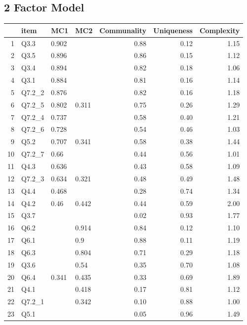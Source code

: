 \documentclass[../main.tex]{subfiles}
\begin{document}
        \subsection{2 Factor Model}

            \begin{table}[ht]
                \centering
                \begin{tabular}{rlllrrr}
                    \hline
                    & item & MC1 & MC2 & Communality & Uniqueness & Complexity \\
                    \hline
                    1 & Q3.3 & 0.902 &  & 0.88 & 0.12 & 1.15 \\
                    2 & Q3.5 & 0.896 &  & 0.86 & 0.15 & 1.12 \\
                    3 & Q3.4 & 0.894 &  & 0.82 & 0.18 & 1.06 \\
                    4 & Q3.1 & 0.884 &  & 0.81 & 0.16 & 1.14 \\
                    5 & Q7.2\_2 & 0.876 &  & 0.82 & 0.16 & 1.18 \\
                    6 & Q7.2\_5 & 0.802 & 0.311 & 0.75 & 0.26 & 1.29 \\
                    7 & Q7.2\_4 & 0.737 &  & 0.58 & 0.40 & 1.21 \\
                    8 & Q7.2\_6 & 0.728 &  & 0.54 & 0.46 & 1.03 \\
                    9 & Q5.2 & 0.707 & 0.341 & 0.58 & 0.38 & 1.44 \\
                    10 & Q7.2\_7 & 0.66 &  & 0.44 & 0.56 & 1.01 \\
                    11 & Q4.3 & 0.636 &  & 0.43 & 0.58 & 1.09 \\
                    12 & Q7.2\_3 & 0.634 & 0.321 & 0.48 & 0.49 & 1.48 \\
                    13 & Q4.4 & 0.468 &  & 0.28 & 0.74 & 1.34 \\
                    14 & Q4.2 & 0.46 & 0.442 & 0.44 & 0.59 & 2.00 \\
                    15 & Q3.7 &  &  & 0.02 & 0.93 & 1.77 \\
                    16 & Q6.2 &  & 0.914 & 0.84 & 0.12 & 1.10 \\
                    17 & Q6.1 &  & 0.9 & 0.88 & 0.11 & 1.19 \\
                    18 & Q6.3 &  & 0.804 & 0.71 & 0.29 & 1.18 \\
                    19 & Q3.6 &  & 0.54 & 0.35 & 0.70 & 1.08 \\
                    20 & Q6.4 & 0.341 & 0.435 & 0.33 & 0.69 & 1.89 \\
                    21 & Q4.1 &  & 0.418 & 0.17 & 0.81 & 1.12 \\
                    22 & Q7.2\_1 &  & 0.342 & 0.10 & 0.88 & 1.00 \\
                    23 & Q5.1 &  &  & 0.05 & 0.96 & 1.49 \\
                    \hline
                \end{tabular}
            \end{table}
\end{document}
